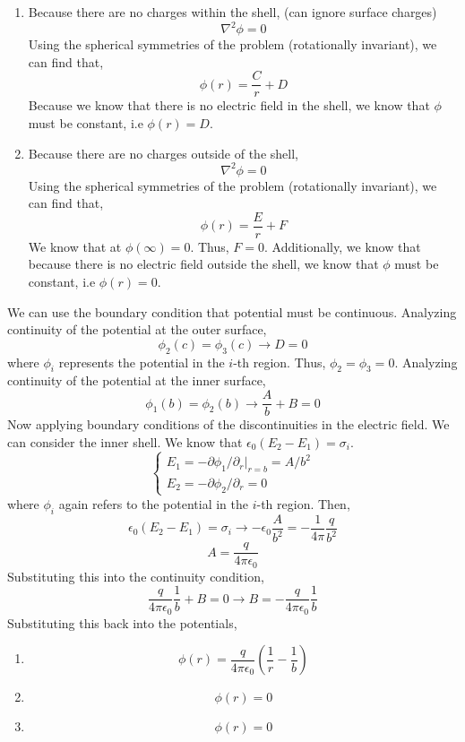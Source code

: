 \documentclass[12pt]{article}
\begin{document}
\begin{enumerate}
\begin{enumerate}
\begin{enumerate}
			\item [ii.]
			Because there are no charges within the shell, (can ignore surface charges)
			\[\nabla^2\phi = 0\]
			Using the spherical symmetries of the problem (rotationally invariant), we can find that,
			\[\phi(r)=\frac{C}{r}+D\]
			Because we know that there is no electric field in the shell, we know that $\phi$ must be constant, i.e $\phi(r)=D$.
			
			\item [iii.]
			Because there are no charges outside of the shell,
			\[\nabla^2 \phi = 0\]
			Using the spherical symmetries of the problem (rotationally invariant), we can find that,
			\[\phi(r)=\frac{E}{r}+F\]
			We know that at $\phi(\infty)=0$. 
			Thus, $F=0$.
			Additionally, we know that because there is no electric field outside the shell, we know that $\phi$ must be constant, i.e $\phi(r)=0$.

		\end{enumerate}

		We can use the boundary condition that potential must be continuous.
		Analyzing continuity of the potential at the outer surface,
		\[\phi_2(c)=\phi_3(c) \to D=0\]
		where $\phi_i$ represents the potential in the $i$-th region.
		Thus, $\phi_2 = \phi_3 = 0$.
		Analyzing continuity of the potential at the inner surface,
		\[\phi_1(b)=\phi_2(b)\to \frac{A}{b}+B = 0\]
		Now applying boundary conditions of the discontinuities in the electric field.
		We can consider the inner shell.
		We know that $\epsilon_0(E_2-E_1)=\sigma_i$.
		\[\begin{cases}
			E_1 = -\partial \phi_1/\partial _r |_{r=b}=A/b^2 \\ 
			E_2 = -\partial\phi_2/\partial_r = 0	
		\end{cases}\]
		where $\phi_i$ again refers to the potential in the $i$-th region.
		Then,
		\[\epsilon_0(E_2-E_1)=\sigma_i \to -\epsilon_0\frac{A}{b^2}=-\frac{1}{4\pi}\frac{q}{b^2}\]
		\[A =\frac{q}{4\pi\epsilon_0}\]
		Substituting this into the continuity condition,
		\[\frac{q}{4\pi\epsilon_0}\frac{1}{b}+B=0\to B = -\frac{q}{4\pi\epsilon_0}\frac{1}{b}\]
		Substituting this back into the potentials,
		\begin{enumerate}
			\item [i.]
			\[\boxed{\phi(r)=\frac{q}{4\pi\epsilon_0}\left(\frac{1}{r}-\frac{1}{b}\right)}\]

			\item [ii.]
			\[\boxed{\phi(r)=0}\]

			\item [iii.]
			\[\boxed{\phi(r)=0}\]
		\end{enumerate}


\end{enumerate}
\end{enumerate}
\end{document}
